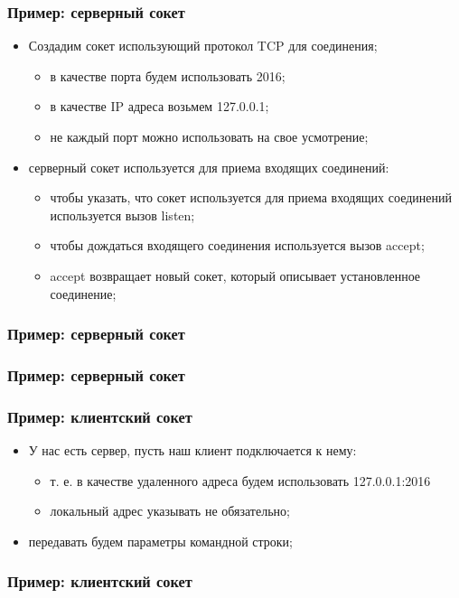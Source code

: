 \begin{frame}
\frametitle{Пример: серверный сокет}

\begin{itemize}
  \item<1-> Создадим сокет использующий протокол TCP для соединения;
    \begin{itemize}
      \item в качестве порта будем использовать 2016;
      \item в качестве IP адреса возьмем 127.0.0.1;
      \item не каждый порт можно использовать на свое усмотрение;
    \end{itemize}
  \item<2-> серверный сокет используется для приема входящих соединений:
    \begin{itemize}
      \item чтобы указать, что сокет используется для приема входящих соединений используется вызов listen;
      \item чтобы дождаться входящего соединения используется вызов accept;
      \item accept возвращает новый сокет, который описывает установленное соединение;
    \end{itemize}
\end{itemize}
\end{frame}

\begin{frame}[fragile]
\frametitle{Пример: серверный сокет}

\end{frame}

\begin{frame}[fragile]
\frametitle{Пример: серверный сокет}

\end{frame}

\begin{frame}
\frametitle{Пример: клиентский сокет}

\begin{itemize}
  \item У нас есть сервер, пусть наш клиент подключается к нему:
    \begin{itemize}
      \item т. е. в качестве удаленного адреса будем использовать 127.0.0.1:2016
      \item локальный адрес указывать не обязательно;
    \end{itemize}
  \item передавать будем параметры командной строки;
\end{itemize}
\end{frame}

\begin{frame}[fragile]
\frametitle{Пример: клиентский сокет}

\end{frame}
